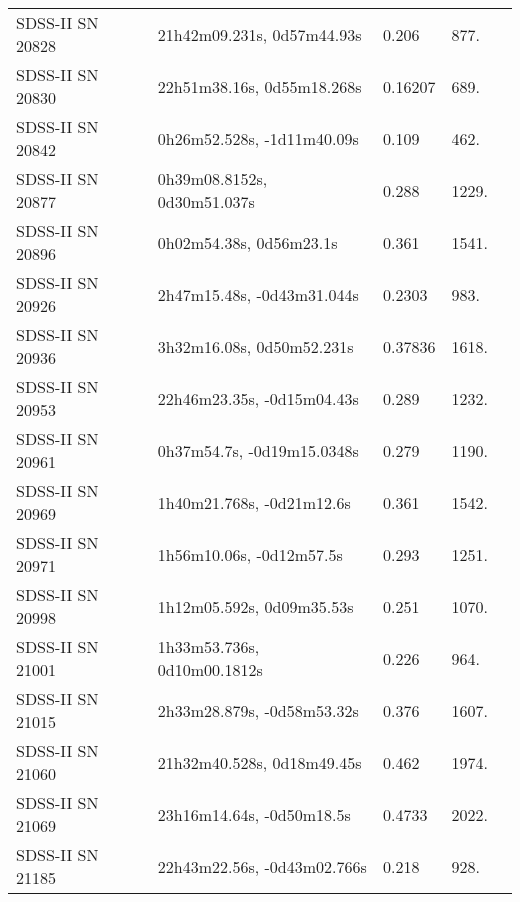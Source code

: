 \begin{longtable}{lllll}
 SDSS-II SN 20828 &     21h42m09.231s, 0d57m44.93s &    0.206 &           877. &    \citet{2011ApJ...738..162S} \\
 SDSS-II SN 20830 &     22h51m38.16s, 0d55m18.268s &  0.16207 &           689. &    \citet{2016SDSSD.C...0000:} \\
 SDSS-II SN 20842 &     0h26m52.528s, -1d11m40.09s &    0.109 &           462. &    \citet{2011ApJ...738..162S} \\
 SDSS-II SN 20877 &    0h39m08.8152s, 0d30m51.037s &    0.288 &          1229. &    \citet{2011ApJ...738..162S} \\
 SDSS-II SN 20896 &        0h02m54.38s, 0d56m23.1s &    0.361 &          1541. &    \citet{2010ApJ...713.1026D} \\
 SDSS-II SN 20926 &     2h47m15.48s, -0d43m31.044s &   0.2303 &           983. &    \citet{2016SDSSD.C...0000:} \\
 SDSS-II SN 20936 &      3h32m16.08s, 0d50m52.231s &  0.37836 &          1618. &    \citet{2016SDSSD.C...0000:} \\
 SDSS-II SN 20953 &     22h46m23.35s, -0d15m04.43s &    0.289 &          1232. &    \citet{2011ApJ...738..162S} \\
 SDSS-II SN 20961 &     0h37m54.7s, -0d19m15.0348s &    0.279 &          1190. &    \citet{2011ApJ...738..162S} \\
 SDSS-II SN 20969 &      1h40m21.768s, -0d21m12.6s &    0.361 &          1542. &    \citet{2011ApJ...738..162S} \\
 SDSS-II SN 20971 &       1h56m10.06s, -0d12m57.5s &    0.293 &          1251. &    \citet{2010ApJ...713.1026D} \\
 SDSS-II SN 20998 &      1h12m05.592s, 0d09m35.53s &    0.251 &          1070. &    \citet{2011ApJ...738..162S} \\
 SDSS-II SN 21001 &    1h33m53.736s, 0d10m00.1812s &    0.226 &           964. &    \citet{2011ApJ...738..162S} \\
 SDSS-II SN 21015 &     2h33m28.879s, -0d58m53.32s &    0.376 &          1607. &    \citet{2010ApJ...713.1026D} \\
 SDSS-II SN 21060 &     21h32m40.528s, 0d18m49.45s &    0.462 &          1974. &    \citet{2011ApJ...738..162S} \\
 SDSS-II SN 21069 &      23h16m14.64s, -0d50m18.5s &   0.4733 &          2022. &    \citet{2016SDSSD.C...0000:} \\
 SDSS-II SN 21185 &    22h43m22.56s, -0d43m02.766s &    0.218 &           928. &    \citet{2011ApJ...738..162S} \\

\end{longtable}
